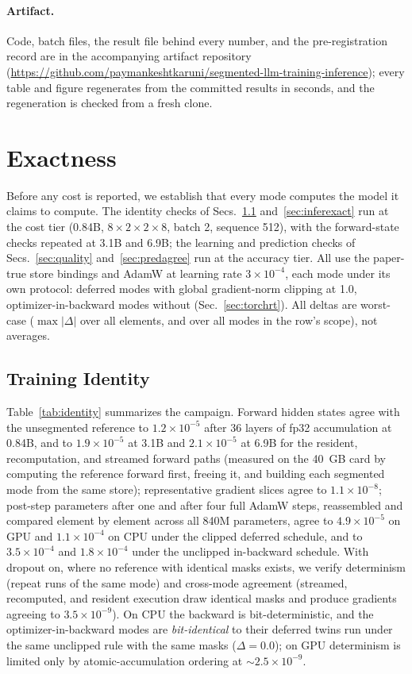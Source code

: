 \documentclass[journal]{IEEEtran}
\begin{document}
\paragraph{Artifact.} Code, batch files, the result file behind every
number, and the pre-registration record are in the accompanying artifact
repository (\url{https://github.com/paymankeshtkaruni/segmented-llm-training-inference}); every table and figure regenerates from
the committed results in seconds, and the regeneration is checked from a
fresh clone.


\section{Exactness}\label{sec:exact}
Before any cost is reported, we establish that every mode computes the model
it claims to compute. The identity checks of Secs.~\ref{sec:trainexact}
and~\ref{sec:inferexact} run at the cost tier (0.84B,
$8{\times}2{\times}2{\times}8$, batch 2, sequence 512), with the forward-state
checks repeated at 3.1B and 6.9B; the learning and prediction checks of
Secs.~\ref{sec:quality} and~\ref{sec:predagree} run at the accuracy tier.
All use the paper-true store bindings and AdamW at learning rate
$3{\times}10^{-4}$, each mode under its own protocol: deferred modes with global gradient-norm
clipping at 1.0, optimizer-in-backward modes without
(Sec.~\ref{sec:torchrt}). All deltas are worst-case ($\max|\Delta|$
over all elements, and over all modes in the row's scope), not averages.

\subsection{Training Identity}\label{sec:trainexact}
Table~\ref{tab:identity} summarizes the campaign. Forward hidden states
agree with the unsegmented reference to $1.2{\times}10^{-5}$ after 36 layers
of fp32 accumulation at 0.84B, and to $1.9{\times}10^{-5}$ at 3.1B and
$2.1{\times}10^{-5}$ at 6.9B for the resident, recomputation, and streamed
forward paths (measured on the 40~GB card by computing the reference forward
first, freeing it, and building each segmented mode from the same store); representative gradient slices agree to
$1.1{\times}10^{-8}$; post-step parameters after one and after four full
AdamW steps, reassembled and compared element by element across all 840M
parameters, agree to $4.9{\times}10^{-5}$ on GPU and $1.1{\times}10^{-4}$ on CPU under
the clipped deferred schedule, and to $3.5{\times}10^{-4}$ and
$1.8{\times}10^{-4}$ under the unclipped in-backward schedule. With dropout
on, where no reference
with identical masks exists, we verify determinism (repeat runs of the same
mode) and cross-mode agreement (streamed, recomputed, and resident execution
draw identical masks and produce gradients agreeing to
$3.5{\times}10^{-9}$). On CPU the backward is bit-deterministic, and the
optimizer-in-backward modes are \emph{bit-identical} to their deferred twins
run under the same unclipped rule with the same masks ($\Delta=0.0$); on
GPU determinism is limited only by atomic-accumulation ordering at
${\sim}2.5{\times}10^{-9}$.
\end{document}
